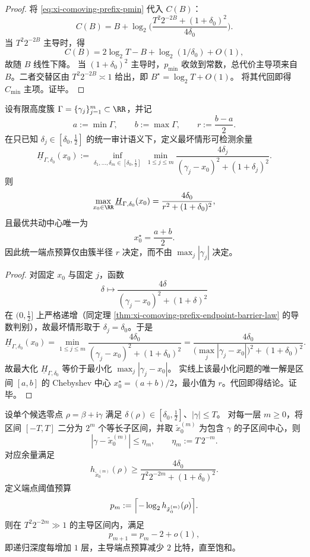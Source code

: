 \begin{proof}
将 \eqref{eq:xi-comoving-prefix-pmin} 代入 \(C(B)\)：
\[
C(B)
=
B+\log_2\!\Biggl(
\frac{T^2 2^{-2B}+(1+\delta_0)^2}{4\delta_0}
\Biggr).
\]
当 \(T^2 2^{-2B}\) 主导时，得
\[
C(B)
=
2\log_2 T-B+\log_2(1/\delta_0)+O(1),
\]
故随 \(B\) 线性下降。  
当 \((1+\delta_0)^2\) 主导时，\(p_{\min}\) 收敛到常数，总代价主导项来自 \(B\)。二者交替区由
\(
T^2 2^{-2B}\asymp 1
\)
给出，即 \(B^\star=\log_2 T+O(1)\)。
将其代回即得 \(C_{\min}\) 主项。证毕。
\end{proof}

\begin{proposition}\label{prop:xi-comoving-prefix-chebyshev-center-law}
设有限高度簇 \(\Gamma=\{\gamma_j\}_{j=1}^m\subset\RR\)，并记
\[
a:=\min\Gamma,\qquad
b:=\max\Gamma,\qquad
r:=\frac{b-a}{2}.
\]
在只已知 \(\delta_j\in[\delta_0,\tfrac12]\) 的统一审计语义下，定义最坏情形可检测余量
\[
\underline H_{\Gamma,\delta_0}(x_0)
:=
\inf_{\delta_1,\dots,\delta_m\in[\delta_0,\tfrac12]}
\ \min_{1\le j\le m}
\frac{4\delta_j}{(\gamma_j-x_0)^2+(1+\delta_j)^2}.
\]
则
\[
\max_{x_0\in\RR}\underline H_{\Gamma,\delta_0}(x_0)
=
\frac{4\delta_0}{r^2+(1+\delta_0)^2},
\]
且最优共动中心唯一为
\[
x_0^\star=\frac{a+b}{2}.
\]
因此统一端点预算仅由簇半径 \(r\) 决定，而不由 \(\max_j|\gamma_j|\) 决定。
\end{proposition}

\begin{proof}
对固定 \(x_0\) 与固定 \(j\)，函数
\[
\delta\mapsto \frac{4\delta}{(\gamma_j-x_0)^2+(1+\delta)^2}
\]
在 \((0,\tfrac12]\) 上严格递增（同定理 \ref{thm:xi-comoving-prefix-endpoint-barrier-law} 的导数判别），故最坏情形取于 \(\delta_j=\delta_0\)。于是
\[
\underline H_{\Gamma,\delta_0}(x_0)
=
\min_{1\le j\le m}
\frac{4\delta_0}{(\gamma_j-x_0)^2+(1+\delta_0)^2}
=
\frac{4\delta_0}{\bigl(\max_j|\gamma_j-x_0|\bigr)^2+(1+\delta_0)^2}.
\]
故最大化 \(\underline H_{\Gamma,\delta_0}\) 等价于最小化
\(
\max_j|\gamma_j-x_0|
\)。
实线上该最小化问题的唯一解是区间 \([a,b]\) 的 Chebyshev 中心 \(x_0^\star=(a+b)/2\)，最小值为 \(r\)。代回即得结论。证毕。
\end{proof}

\begin{theorem}[递归二分共动定位的二次误差衰减]\label{thm:xi-comoving-prefix-recursive-bisection}
设单个候选零点 \(\rho=\beta+\mathrm{i}\gamma\) 满足 \(\delta(\rho)\in[\delta_0,\tfrac12]\)、\(|\gamma|\le T\)。
对每一层 \(m\ge 0\)，将区间 \([-T,T]\) 二分为 \(2^m\) 个等长子区间，并取 \(\tilde x_0^{(m)}\) 为包含 \(\gamma\) 的子区间中心，则
\[
|\gamma-\tilde x_0^{(m)}|
\le
\eta_m,
\qquad
\eta_m:=T\,2^{-m}.
\]
对应余量满足
\begin{equation}\label{eq:xi-comoving-prefix-recursive-margin}
h_{\tilde x_0^{(m)}}(\rho)
\ge
\frac{4\delta_0}{T^2 2^{-2m}+(1+\delta_0)^2}.
\end{equation}
定义端点阈值预算
\[
p_m:=\Bigl\lceil-\log_2 h_{\tilde x_0^{(m)}}(\rho)\Bigr\rceil.
\]
则在 \(T^2 2^{-2m}\gg 1\) 的主导区间内，满足
\[
p_{m+1}=p_m-2+o(1),
\]
即递归深度每增加 \(1\) 层，主导端点预算减少 \(2\) 比特，直至饱和。
\end{theorem}

